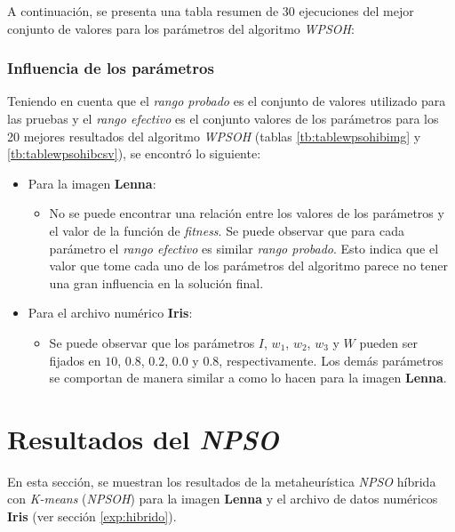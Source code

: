     A continuación, se presenta una tabla resumen de 30 ejecuciones del mejor
conjunto de valores para los parámetros del algoritmo \emph{WPSOH}:



\subsubsection{Influencia de los parámetros}

Teniendo en cuenta que el \emph{rango probado} es el conjunto de valores utilizado
para las pruebas y el \emph{rango efectivo} es el conjunto valores de los parámetros
para los 20 mejores resultados del algoritmo \emph{WPSOH} (tablas \ref{tb:tablewpsohibimg}
y \ref{tb:tablewpsohibcsv}), se encontró lo siguiente:

\begin{itemize}
	\item Para la imagen \textbf{Lenna}:
	\begin{itemize}
		\item No se puede encontrar una relación entre los valores de los
			parámetros y el valor de la función de \emph{fitness}. Se
			puede observar que para cada parámetro el \emph{rango efectivo}
			es similar \emph{rango probado}. Esto indica que el valor que tome cada
			uno de los parámetros del algoritmo parece no tener una gran influencia en la
			solución final.
	\end{itemize}
	\item Para el archivo numérico \textbf{Iris}:
	\begin{itemize}
		\item Se puede observar que los parámetros $I$, $w_1$, $w_2$, $w_3$ y
			$W$ pueden ser fijados en $10$, $0.8$, $0.2$, $0.0$ y $0.8$,
			respectivamente. Los demás parámetros se comportan de manera similar 
			a como lo hacen para la imagen {\bf Lenna}.
	\end{itemize}
\end{itemize}

\section{Resultados del \emph{NPSO}}

    En esta sección, se muestran los resultados de la metaheurística \emph{NPSO}
híbrida con \emph{K-means} (\emph{NPSOH}) para la imagen \textbf{Lenna} y el archivo
de datos numéricos \textbf{Iris} (ver sección \ref{exp:hibrido}).

